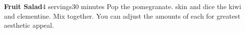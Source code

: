 \documentclass[../Cookbook.tex]{subfiles}
\begin{document}
\begin{recipe}[FruitSalad]{\textbf{Fruit Salad}}{4 servings}{30 minutes}
Pop the pomegranate. skin and dice the kiwi and clementine. Mix together. You can adjust the amounts of each for greatest aesthetic appeal.
\end{recipe}
\end{document}
